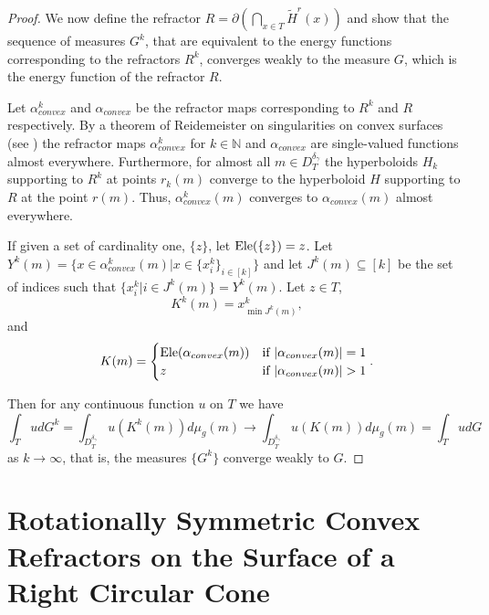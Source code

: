 \documentclass[review]{elsarticle}
\newcounter{cases}
\begin{document}
\begin{proof}
We now define the refractor $R = \partial(\bigcap_{x\in T}\tilde{H}^r(x))$ and show that the sequence of measures $G^k$, that are equivalent to the energy functions corresponding to the refractors $R^k$, converges weakly to the measure $G$, which is the energy function of the refractor $R$.

Let $\alpha_{convex}^k$ and $\alpha_{convex}$ be the refractor maps corresponding to $R^k$ and $R$ respectively. By a theorem of Reidemeister on singularities on convex surfaces (see \cite{schneider_2013}) the refractor maps $\alpha_{convex}^k$ for $k \in \mathbb{N}$ and $\alpha_{convex}$ are single-valued functions almost everywhere. Furthermore, for almost all $m\in D_T^{\delta_\gamma}$ the hyperboloids $H_k$ supporting to $R^k$ at points $r_k(m)$ converge to the hyperboloid $H$ supporting to $R$ at the point $r(m)$. Thus, $\alpha_{convex}^k(m)$ converges to $\alpha_{convex}(m)$ almost everywhere. 

If given a set of cardinality one, $\{z\}$, let $\textnormal{Ele}(\{z\})=z$. Let $Y^k(m)=\{x\in \alpha_{convex}^k(m)|x\in \{x_i^k\}_{i\in [k]}\}$ and let $J^k(m)\subseteq [k]$ be the set of indices such that $\{x_i^k|i\in J^k(m)\}=Y^k(m)$.
Let $z\in T$,
\begin{equation}
K^k(m)= x_{\min J^k(m)}^k,
\end{equation}
and 
\begin{equation}
K(m)= \begin{cases}
        \textnormal{Ele}(\alpha_{convex}(m)) & \text{if } |\alpha_{convex}(m)|=1\\
        z & \text{if } |\alpha_{convex}(m)|>1
    \end{cases}.
\end{equation}

Then for any continuous function $u$ on $T$ we have
\begin{equation}
    \int_T u dG^k=\int_{D_T^{\delta_\gamma}}u(K^k(m))d\mu_{g}(m)\longrightarrow \int_{D_T^{\delta_\gamma}}u(K(m))d\mu_{g}(m)=\int_T u dG
\end{equation}
as $k \to \infty$, that is, the measures $\{G^k\}$ converge weakly to $G$.
\end{proof}



\section{Rotationally Symmetric Convex Refractors on the Surface of a Right Circular Cone}
\end{document}
